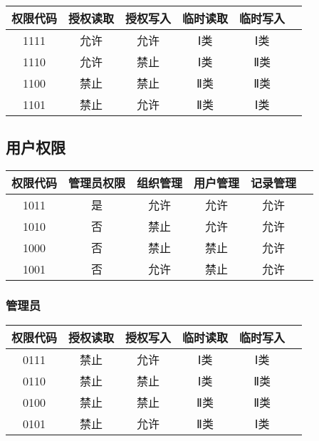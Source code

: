 \documentclass[UTF8]{ctexart}
\begin{document}
    \begin{center}
    \begin{tabular}{cccccc}
        \hline
        权限代码& 授权读取& 授权写入& 临时读取& 临时写入\\
        \hline
        1111& 允许& 允许& Ⅰ类& Ⅰ类\\
        1110& 允许& 禁止& Ⅰ类& Ⅱ类\\
        1100& 禁止& 禁止& Ⅱ类& Ⅱ类\\
        1101& 禁止& 允许& Ⅱ类& Ⅰ类\\
        \hline
    \end{tabular}
    \end{center}
    \subsection{用户权限}
    
    \begin{center}
        \begin{tabular}{cccccc}
            \hline
            权限代码& 管理员权限& 组织管理& 用户管理& 记录管理\\
            \hline
            1011& 是& 允许& 允许& 允许\\
            1010& 否& 禁止& 允许& 允许\\
            1000& 否& 禁止& 禁止& 允许\\
            1001& 否& 允许& 禁止& 允许\\
            \hline
        \end{tabular}
    \end{center}
    \subsubsection{管理员}
    
    \begin{center}
    \begin{tabular}{cccccc}
        \hline
        权限代码& 授权读取& 授权写入& 临时读取& 临时写入\\
        \hline
        0111& 禁止& 允许& Ⅰ类& Ⅰ类\\
        0110& 禁止& 禁止& Ⅰ类& Ⅱ类\\
        0100& 禁止& 禁止& Ⅱ类& Ⅱ类\\
        0101& 禁止& 允许& Ⅱ类& Ⅰ类\\
        \hline
    \end{tabular}
    \end{center}
    
\end{document}
